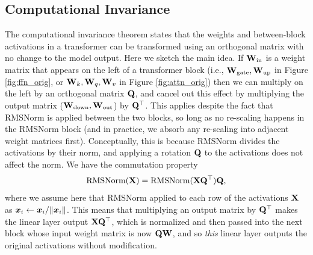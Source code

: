 \subsection{Computational Invariance}
The computational invariance theorem \citep[Theorem 1]{slicegpt} states that the weights and between-block activations in a transformer can be transformed using an orthogonal matrix with no change to the model output. Here we sketch the main idea. If ${\mathbf{W}}_\textrm{in}$ is a weight matrix that appears on the left of a transformer block (i.e., ${\mathbf{W}}_\textrm{gate}, {\mathbf{W}}_\textrm{up}$ in Figure \ref{fig:ffn_orig}, or ${\mathbf{W}}_k, {\mathbf{W}}_q, {\mathbf{W}}_v$ in Figure \ref{fig:attn_orig}) then we can multiply on the left by an orthogonal matrix ${\mathbf{Q}}$, and cancel out this effect by multiplying the output matrix (${\mathbf{W}}_\textrm{down}, {\mathbf{W}}_\textrm{out}$) by ${\mathbf{Q}}^\top$. This applies despite the fact that RMSNorm is applied between the two blocks, so long as no re-scaling happens in the RMSNorm block (and in practice, we absorb any re-scaling into adjacent weight matrices first). Conceptually, this is because RMSNorm divides the activations by their norm, and applying a rotation ${\mathbf{Q}}$ to the activations does not affect the norm. We have the commutation property
\begin{equation}
    \textrm{RMSNorm}({\mathbf{X}}) = \textrm{RMSNorm}({\mathbf{X}}{\mathbf{Q}}^\top){\mathbf{Q}},
\end{equation}
where we assume here that RMSNorm applied to each row of the activations ${\mathbf{X}}$ as ${\bm{x}}_i \leftarrow {\bm{x}}_i/\Vert{\bm{x}}_i\Vert$. This means that multiplying an output matrix by ${\mathbf{Q}}^\top$ makes the linear layer output ${\mathbf{X}}{\mathbf{Q}}^\top$, which is normalized and then passed into the next block whose input weight matrix is now ${\mathbf{Q}}{\mathbf{W}}$, and so \emph{this} linear layer outputs the original activations without modification. 

